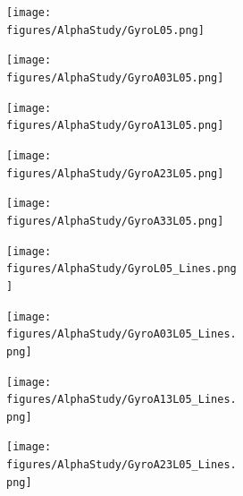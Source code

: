 \begin{figure}[ht]
    \centering
    \begin{subfigure}{\textwidth}
        \centering
        \begin{subfigure}{.19\textwidth}
            \centering
            \texttt{[image: figures/AlphaStudy/GyroL05.png]}
        \end{subfigure}
        \begin{subfigure}{.19\textwidth}
            \centering
            \texttt{[image: figures/AlphaStudy/GyroA03L05.png]}
        \end{subfigure}
        \begin{subfigure}{.19\textwidth}
            \centering
            \texttt{[image: figures/AlphaStudy/GyroA13L05.png]}
        \end{subfigure}
        \begin{subfigure}{.19\textwidth}
            \centering
            \texttt{[image: figures/AlphaStudy/GyroA23L05.png]}
        \end{subfigure}
        \begin{subfigure}{.19\textwidth}
            \centering
            \texttt{[image: figures/AlphaStudy/GyroA33L05.png]}
        \end{subfigure}
    \end{subfigure}
    \begin{subfigure}{\textwidth}
        \centering
        \begin{subfigure}{.19\textwidth}
            \centering
            \texttt{[image: figures/AlphaStudy/GyroL05\_Lines.png]}
            \caption{}
        \end{subfigure}
        \begin{subfigure}{.19\textwidth}
            \centering
            \texttt{[image: figures/AlphaStudy/GyroA03L05\_Lines.png]}
            \caption{}
        \end{subfigure}
        \begin{subfigure}{.19\textwidth}
            \centering
            \texttt{[image: figures/AlphaStudy/GyroA13L05\_Lines.png]}
            \caption{}
        \end{subfigure}
        \begin{subfigure}{.19\textwidth}
            \centering
            \texttt{[image: figures/AlphaStudy/GyroA23L05\_Lines.png]}
            \caption{}
        \end{subfigure}
        \begin{subfigure}{.19\textwidth}

\end{subfigure}
\end{subfigure}
\end{figure}
